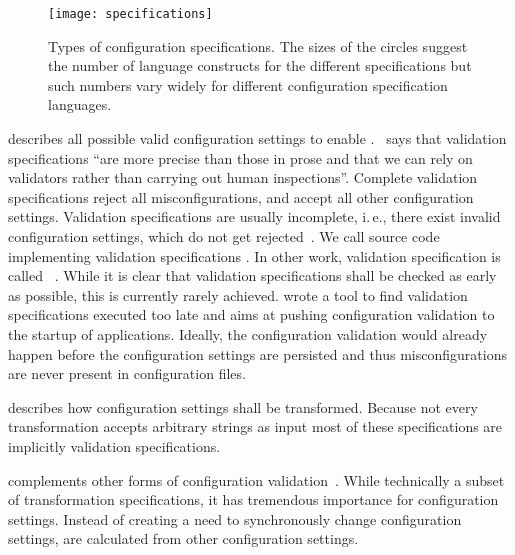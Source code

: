 \begin{figure}[htp]
\centering
\texttt{[image: specifications]}
\caption[Types of configuration specifications.]{Types of configuration specifications.
The sizes of the circles suggest the number of language constructs for the different specifications but such numbers vary widely for different configuration specification languages.}
\label{fig:specifications}
\end{figure}

\begin{description}[font=\textintro]
\item[Validation specification] 
describes all possible valid configuration settings to enable .
\citet{murata2005taxonomy}~says that validation specifications \enquote{are more precise than those in prose and that we can rely on validators rather than carrying out human inspections}.
Complete validation specifications reject all misconfigurations, and accept all other configuration settings.
Validation specifications are usually incomplete, i.\,e., there exist invalid configuration settings, which do not get rejected~\cite{huang2015confvalley}.
We call source code implementing validation specifications .
In other work, validation specification is called ~\cite{ducharme2004documents,clark2002relax}.
While it is clear that validation specifications shall be checked as early as possible, this is currently rarely achieved.
\citet{xu2016early} wrote a tool to find validation specifications executed too late and aims at pushing configuration validation to the startup of applications.
Ideally, the configuration validation would already happen before the configuration settings are persisted and thus misconfigurations are never present in configuration files.

\item[Transformation specification] 
describes how configuration settings shall be transformed.
Because not every transformation accepts arbitrary strings as input most of these specifications are implicitly validation specifications.

\item[Default value calculation] 
complements other forms of configuration validation~\cite{eichelberger2013systematic,brummermann2012formalizing}.
While technically a subset of transformation specifications, it has tremendous importance for configuration settings.
Instead of creating a need to synchronously change configuration settings,  are calculated from other configuration settings.


\end{description}
